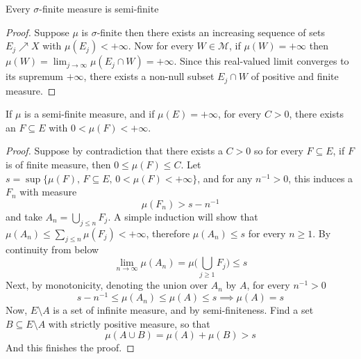 \documentclass[../../main.tex]{subfiles}
\begin{document}
%



\begin{wts}
Every $\sigma$-finite measure is semi-finite
\end{wts}
\begin{proof}
    Suppose $\mu$ is $\sigma$-finite then there exists an increasing sequence of sets $E_j\nearrow X$ with $\mu(E_j)<+\infty$. Now for every $W\in\mathcal{M}$, if $\mu(W)=+\infty$ then $\mu(W)=\lim_{j\to\infty}\mu(E_j\cap W)=+\infty$. Since this real-valued limit converges to its supremum $+\infty$, there exists a non-null subset $E_j\cap W$ of positive and finite measure.
\end{proof}
\newpage



%




\begin{wts}
If $\mu$ is a semi-finite measure, and if $\mu(E)=+\infty$, for every $C>0$, there exists an $F\subseteq E$ with $0<\mu(F)<+\infty$.
\end{wts}
\begin{proof}
    Suppose by contradiction that there exists a $C>0$ so for every $F\subseteq E$, if $F$ is of finite measure, then $0\leq \mu(F)\leq C$. Let $s = \sup\{\mu(F),\,F\subseteq E,\, 0<\mu(F)<+\infty\}$, and for any $n^{-1}>0$, this induces a $F_n$ with measure
    \[
    \mu(F_n)>s-n^{-1}
    \] 
    and take $A_n = \bigcup_{j\leq n}F_j$. A simple induction will show that $\mu(A_n)\leq \sum_{j\leq n} \mu(F_j)<+\infty$, therefore $\mu(A_n)\leq s$ for every $n\geq 1$. By continuity from below
    \[
    \lim_{n\to\infty}\mu(A_n)=\mu\biggl(\bigcup_{j\geq 1}F_j\biggr)\leq s
    \]
    Next, by monotonicity, denoting the union over $A_n$ by $A$, for every $n^{-1}>0$
    \[
    s-n^{-1}\leq\mu(A_n)\leq\mu(A)\leq s\implies \mu(A)=s
    \]
    Now, $E\setminus A$ is a set of infinite measure, and by semi-finiteness. Find a set $B\subseteq E\setminus A$ with strictly positive measure, so that 
    \[
    \mu(A\cup B)=\mu(A)+\mu(B)>s
    \]
And this finishes the proof.
\end{proof}
\newpage

%
\end{document}
